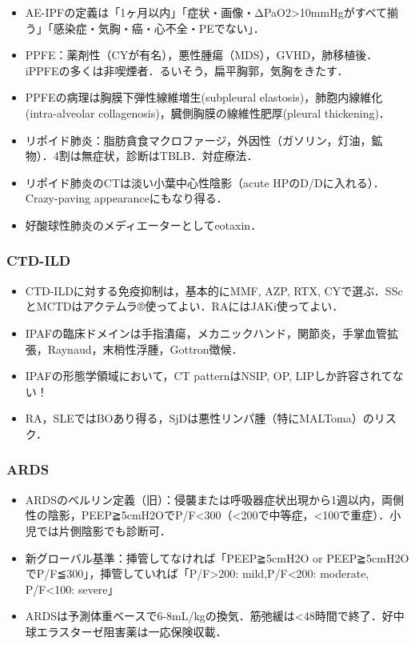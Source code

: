 \begin{itemize}
\item AE-IPFの定義は「1ヶ月以内」「症状・画像・ΔPaO2>10mmHgがすべて揃う」「感染症・気胸・癌・心不全・PEでない」．
\item PPFE：薬剤性（CYが有名），悪性腫瘍（MDS），GVHD，肺移植後．iPPFEの多くは非喫煙者．るいそう，扁平胸郭，気胸をきたす．
\item PPFEの病理は胸膜下弾性線維増生(subpleural elastosis)，肺胞内線維化(intra-alveolar collagenosis)，臓側胸膜の線維性肥厚(pleural thickening)．
\item リポイド肺炎：脂肪貪食マクロファージ，外因性（ガソリン，灯油，鉱物）．4割は無症状，診断はTBLB．対症療法．
\item リポイド肺炎のCTは淡い小葉中心性陰影（acute HPのD/Dに入れる）．Crazy-paving appearanceにもなり得る．
\item 好酸球性肺炎のメディエーターとしてeotaxin．
\end{itemize}


\subsubsection{CTD-ILD}
\begin{itemize}
\item CTD-ILDに対する免疫抑制は，基本的にMMF, AZP, RTX, CYで選ぶ．SScとMCTDはアクテムラ®使ってよい．RAにはJAKi使ってよい．
\item IPAFの臨床ドメインは手指潰瘍，メカニックハンド，関節炎，手掌血管拡張，Raynaud，末梢性浮腫，Gottron徴候．
\item IPAFの形態学領域において，CT patternはNSIP, OP, LIPしか許容されてない！
\item RA，SLEではBOあり得る，SjDは悪性リンパ腫（特にMALToma）のリスク．
\end{itemize}

\subsubsection{ARDS}
\begin{itemize}
\item ARDSのベルリン定義（旧）：侵襲または呼吸器症状出現から1週以内，両側性の陰影，PEEP≧5cmH2OでP/F<300（<200で中等症，<100で重症）．小児では片側陰影でも診断可．
\item 新グローバル基準：挿管してなければ「PEEP≧5cmH2O or PEEP≧5cmH2OでP/F≦300」，挿管していれば「P/F>200: mild,P/F<200: moderate, P/F<100: severe」
\item ARDSは予測体重ベースで6-8mL/kgの換気．筋弛緩は<48時間で終了．好中球エラスターゼ阻害薬は一応保険収載．
\end{itemize}


